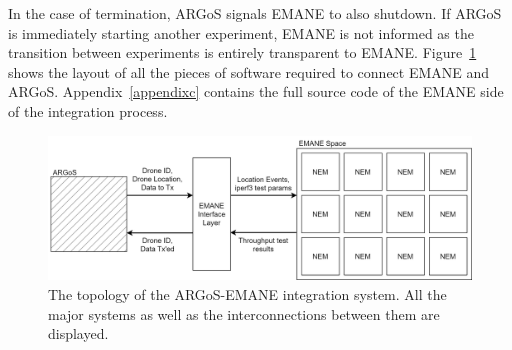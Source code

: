 In the case of termination, ARGoS signals EMANE to also shutdown.
If ARGoS is immediately starting another experiment, EMANE is not informed as the transition between experiments is entirely transparent to EMANE.
Figure~\ref{emane_argos} shows the layout of all the pieces of software required to connect EMANE and ARGoS.
Appendix~\ref{appendixc} contains the full source code of the EMANE side of the integration process.
\begin{figure}[!ht]
    \centering
    \includegraphics[width=\textwidth,keepaspectratio]{Images/Chpt5/ARGoS-EMANE.png}
    \caption{The topology of the ARGoS-EMANE integration system. All the major systems as well as the interconnections between them are displayed.}
    \label{emane_argos}
\end{figure}

